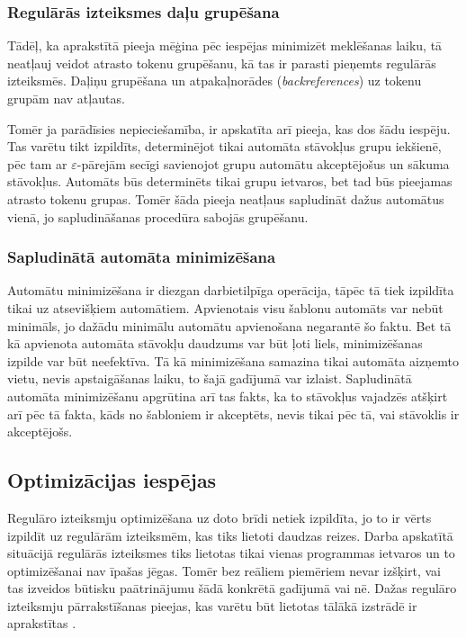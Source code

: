 \subsubsection{Regulārās izteiksmes daļu grupēšana}

Tādēļ, ka aprakstītā pieeja mēģina pēc iespējas minimizēt meklēšanas laiku, tā neatļauj veidot atrasto tokenu grupēšanu, kā tas ir parasti pieņemts regulārās izteiksmēs. Daļiņu grupēšana un atpakaļnorādes (\emph{backreferences}) uz tokenu grupām nav atļautas.

Tomēr ja parādīsies nepieciešamība, ir apskatīta arī pieeja, kas dos šādu iespēju. Tas varētu tikt izpildīts, determinējot tikai automāta stāvokļus grupu iekšienē, pēc tam ar $\varepsilon$-pārejām secīgi savienojot grupu automātu akceptējošus un sākuma stāvokļus. Automāts būs determinēts tikai grupu ietvaros, bet tad būs pieejamas atrasto tokenu grupas. Tomēr šāda pieeja neatļaus sapludināt dažus automātus vienā, jo sapludināšanas procedūra sabojās grupēšanu.

\subsubsection{Sapludinātā automāta minimizēšana}

Automātu minimizēšana ir diezgan darbietilpīga operācija, tāpēc tā tiek izpildīta tikai uz atsevišķiem automātiem. Apvienotais visu šablonu automāts var nebūt minimāls, jo dažādu minimālu automātu apvienošana negarantē šo faktu. Bet tā kā apvienota automāta stāvokļu daudzums var būt ļoti liels, minimizēšanas izpilde var būt neefektīva. Tā kā minimizēšana samazina tikai automāta aizņemto vietu, nevis apstaigāšanas laiku, to šajā gadījumā var izlaist. Sapludinātā automāta minimizēšanu apgrūtina arī tas fakts, ka to stāvokļus vajadzēs atšķirt arī pēc tā fakta, kāds no šabloniem ir akceptēts, nevis tikai pēc tā, vai stāvoklis ir akceptējošs.

\subsection{\label{subsec:solution_optimization}Optimizācijas iespējas}

Regulāro izteiksmju optimizēšana uz doto brīdi netiek izpildīta, jo to ir vērts izpildīt uz regulārām izteiksmēm, kas tiks lietoti daudzas reizes. Darba apskatītā situācijā regulārās izteiksmes tiks lietotas tikai vienas programmas ietvaros un to optimizēšanai nav īpašas jēgas. Tomēr bez reāliem piemēriem nevar izšķirt, vai tas izveidos būtisku paātrinājumu šādā konkrētā gadījumā vai nē. Dažas regulāro izteiksmju pārrakstīšanas pieejas, kas varētu būt lietotas tālākā izstrādē ir aprakstītas \cite{Yu:FMR}.

